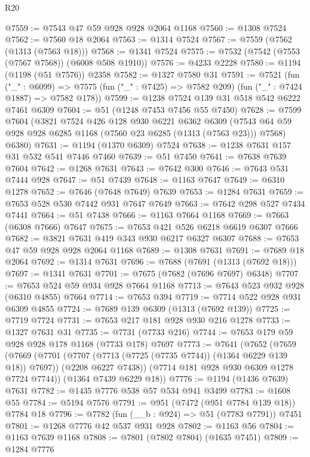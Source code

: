 \begin{lexlean}{R20}
\begin{coremodule}
@7559 := @7543 @47 @59 @928 @928 @2064 @1168
@7560 := @1308 @7524
@7562 := @7560 @18 @2064
@7563 := @1314 @7524
@7567 := @7559 (@7562 (@1313 (@7563 @18)))
@7568 := @1341 @7524
@7575 := @7532 (@7542 (@7553 (@7567 @7568)) (@6008 @508 @1910))
@7576 := @4233 @2228
@7580 := @1194 (@1198 (@51 @7576)) @2358
@7582 := @1327 @7580 @31
@7591 := @7521
    (fun ("_" : @6099) =>
    @7575 (fun ("_" : @7425) => @7582 @209) (fun ("_" : @7424 @1887) => @7582 @178))
@7599 := @1238 @7524 @139 @31 @518 @542 @6222 @7461 @6309
@7604 := @51 (@1248 @7453 @7456 @55 @7450)
@7628 := @7599
    @7604
    (@3821
      @7524
      @426
      @128
      @930
      @6221
      @6362
      @6309
      (@7543 @64 @59 @928 @928 @6285 @1168 (@7560 @23 @6285 (@1313 (@7563 @23))) @7568)
      @6380)
@7631 := @1194 (@1370 @6309) @7524
@7638 := @1238 @7631 @157 @31 @532 @541 @7446 @7460
@7639 := @51 @7450
@7641 := @7638 @7639 @7604
@7642 := @1268 @7631
@7643 := @7642 @300
@7646 := @7643 @531 @7444 @928
@7647 := @51 @7439
@7648 := @1163 @7647
@7649 := @6310 @1278
@7652 := @7646 (@7648 @7649) @7639
@7653 := @1284 @7631
@7659 := @7653 @528 @530 @7442 @931 @7647 @7649
@7663 := @7642 @298 @527 @7434 @7441
@7664 := @51 @7438
@7666 := @1163 @7664 @1168
@7669 := @7663 (@6308 @7666) @7647
@7675 := @7653 @421 @526 @6218 @6619 @6307 @7666
@7682 := @3821 @7631 @419 @343 @930 @6217 @6327 @6307
@7688 := @7653 @47 @59 @928 @928 @2064 @1168
@7689 := @1308 @7631
@7691 := @7689 @18 @2064
@7692 := @1314 @7631
@7696 := @7688 (@7691 (@1313 (@7692 @18)))
@7697 := @1341 @7631
@7701 := @7675 (@7682 (@7696 @7697) @6348)
@7707 := @7653 @524 @59 @934 @928 @7664 @1168
@7713 := @7643 @523 @932 @928 (@6310 @4855) @7664
@7714 := @7653 @394
@7719 := @7714 @522 @928 @931 @6309 @4855
@7724 := @7689 @139 @6309 (@1313 (@7692 @139))
@7725 := @7719 @7724
@7731 := @7653 @217 @181 @928 @930 @216 @1278
@7733 := @1327 @7631 @31
@7735 := @7731 (@7733 @216)
@7744 := @7653 @179 @59 @928 @928 @178 @1168 (@7733 @178) @7697
@7773 := @7641
    (@7652
      (@7659
        (@7669
          (@7701 (@7707 (@7713 (@7725 (@7735 @7744)) (@1364 @6229 @139 @18)) @7697))
          (@2208 @6227 @7438))
        (@7714 @181 @928 @930 @6309 @1278 @7724 @7744))
      (@1364 @7439 @6229 @18))
@7776 := @1194 (@1436 @7639) @7631
@7782 := @1435 @7776 @538 @57 @534 @941 @3499
@7783 := @1608 @55
@7784 := @5194 @7576
@7791 := @951 (@7472 (@951 @7784 @139 @18)) @7784 @18
@7796 := @7782 (fun (__b : @924) => @51 (@7783 @7791)) @7451
@7801 := @1268 @7776 @42 @537 @931 @928
@7802 := @1163 @56
@7804 := @1163 @7639 @1168
@7808 := @7801 (@7802 @7804) (@1635 @7451)
@7809 := @1284 @7776

\end{coremodule}
\end{lexlean}
